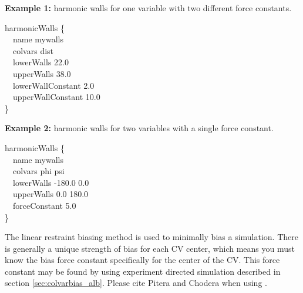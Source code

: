 \begin{itemize}
\end{itemize}

\noindent\textbf{Example 1:} harmonic walls for one variable with two different force constants.
\begin{cvexampleinput}
\-harmonicWalls \{\\
\-\-~~name  mywalls\\
\-\-~~colvars    dist\\
\-\-~~lowerWalls  22.0 \\
\-\-~~upperWalls  38.0 \\
\-\-~~lowerWallConstant  2.0 \\
\-\-~~upperWallConstant 10.0 \\
\-\}
\end{cvexampleinput}

\noindent\textbf{Example 2:} harmonic walls for two variables with a single force constant.
\begin{cvexampleinput}
\-harmonicWalls \{\\
\-\-~~name  mywalls\\
\-\-~~colvars       phi    psi\\
\-\-~~lowerWalls -180.0    0.0\\
\-\-~~upperWalls    0.0  180.0\\
\-\-~~forceConstant 5.0 \\
\-\}
\end{cvexampleinput}



The linear restraint biasing method is used to minimally bias a
simulation. There is generally a unique strength of bias for each CV
center, which means you must know the bias force constant specifically
for the center of the CV. This force constant may be found by using
experiment directed simulation described in
section \ref{sec:colvarbias_alb}. Please cite Pitera and Chodera when
using \cite{Pitera2012}.

